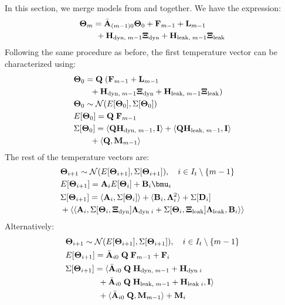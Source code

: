 In this section, we merge models from  and  together. We have the expression:
\begin{align*}
  & \mathbf{\Theta}_{m} = \Bar{\mathbf{A}}_{(m - 1)0} \mathbf{\Theta}_0 + \mathbf{F}_{m - 1} + \mathbf{L}_{m - 1} \\
  & {} \qquad + \mathbf{H}_{\text{dyn}, \; m - 1} \mathbf{\Xi}_{\text{dyn}} + \mathbf{H}_{\text{leak}, \; m - 1} \mathbf{\Xi}_{\text{leak}}
\end{align*}
Following the same procedure as before, the first temperature vector can be characterized using:
\begin{align*}
  & \mathbf{\Theta}_0 = \mathbf{Q} \; (\mathbf{F}_{m - 1} + \mathbf{L}_{m - 1} \\
  & {} \qquad + \mathbf{H}_{\text{dyn}, \; m - 1} \mathbf{\Xi}_{\text{dyn}} + \mathbf{H}_{\text{leak}, \; m - 1} \mathbf{\Xi}_{\text{leak}}) \\
  & \mathbf{\Theta}_0 \sim \mathcal{N}(E[\mathbf{\Theta}_0], \Sigma[\mathbf{\Theta}_0]) \\
  & E[\mathbf{\Theta}_0] = \mathbf{Q} \; \mathbf{F}_{m - 1} \\
  & \Sigma[\mathbf{\Theta}_0] = \langle \mathbf{Q} \mathbf{H}_{\text{dyn}, \; m - 1}, \mathbf{I} \rangle + \langle \mathbf{Q} \mathbf{H}_{\text{leak}, \; m - 1}, \mathbf{I} \rangle \\
  & {} \qquad + \langle \mathbf{Q}, \mathbf{M}_{m - 1} \rangle
\end{align*}
The rest of the temperature vectors are:
\begin{align*}
  & \vtemp_{i + 1} \sim \normal(\expect{\vtemp_{i + 1}}, \cov{\vtemp_{i + 1}}), \sep i \in \timeindex \setminus \{\stepcount - 1\} \\
  & \expect{\vtemp_{i+1}} = \m{A}_i \expect{\vtemp_i} + \m{B}_i \vmean{i} \\
  & \cov{\vtemp_{i + 1}} = \dbl{\m{A}_i, \cov{\vtemp_i}} + \dbl{\m{B}_i, \ddev{i}^2} + \cov{\m{D}_i} \\
  & {} + \dbl{\dbl{\m{A}_i, \cov{\vtemp_i, \vnormal_\dyn} \ddev{\dyn \; i} + \cov{\vtemp_i, \vnormal_\leak} \ddev{\leak}, \m{B}_i}}
\end{align*}
Alternatively:
\begin{align*}
  & \mathbf{\Theta}_{i + 1} \sim \mathcal{N}(E[\mathbf{\Theta}_{i + 1}], \Sigma[\mathbf{\Theta}_{i + 1}]), \hspace{10pt} i \in I_t \setminus \{m - 1\} \\
  & E[\mathbf{\Theta}_{i + 1}] = \Bar{\mathbf{A}}_{i0} \; \mathbf{Q} \; \mathbf{F}_{m - 1} + \mathbf{F}_i \\
  & \Sigma[\mathbf{\Theta}_{i + 1}] = \langle \Bar{\mathbf{A}}_{i0} \; \mathbf{Q} \; \mathbf{H}_{\text{dyn}, \; m - 1} + \mathbf{H}_{\text{dyn} \; i} \\
  & { } \qquad \qquad + \Bar{\mathbf{A}}_{i0} \; \mathbf{Q} \; \mathbf{H}_{\text{leak}, \; m - 1} + \mathbf{H}_{\text{leak} \; i}, \mathbf{I} \rangle \\
  & { } \qquad \qquad + \langle \Bar{\mathbf{A}}_{i0} \; \mathbf{Q}, \mathbf{M}_{m - 1} \rangle + \mathbf{M}_i
\end{align*}

